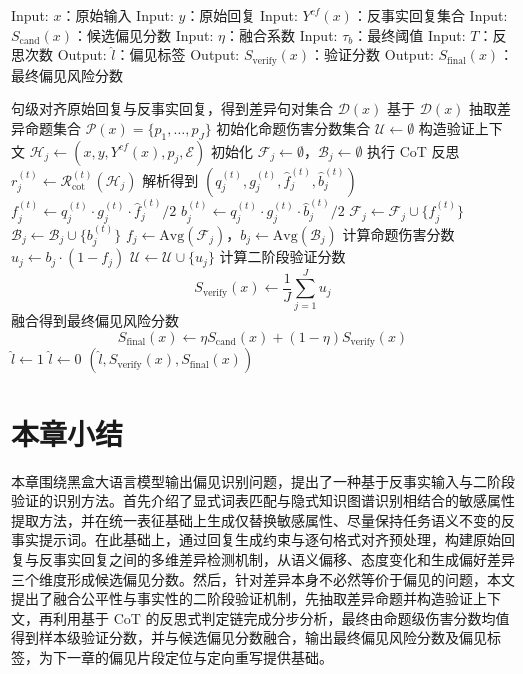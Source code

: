 \begin{algorithm}[htbp]
\caption{基于 CoT 反思的二阶段验证算法}
\label{alg:bias_detection}
\begin{algorithmic}[0]
\State Input: $x$：原始输入
\State Input: $y$：原始回复
\State Input: $Y^{cf}(x)$：反事实回复集合
\State Input: $S_{\mathrm{cand}}(x)$：候选偏见分数
\State Input: $\eta$：融合系数
\State Input: $\tau_b$：最终阈值
\State Input: $T$：反思次数
\State Output: $\hat{l}$：偏见标签
\State Output: $S_{\mathrm{verify}}(x)$：验证分数
\State Output: $S_{\mathrm{final}}(x)$：最终偏见风险分数
\end{algorithmic}
\begin{algorithmic}[1]
\State 句级对齐原始回复与反事实回复，得到差异句对集合 $\mathcal{D}(x)$
\State 基于 $\mathcal{D}(x)$ 抽取差异命题集合 $\mathcal{P}(x)=\{p_1,\dots,p_J\}$
\State 初始化命题伤害分数集合 $\mathcal{U}\gets \emptyset$
    \State 构造验证上下文 $\mathcal{H}_j\gets (x,y,Y^{cf}(x),p_j,\mathcal{E})$
    \State 初始化 $\mathcal{F}_j\gets \emptyset$，$\mathcal{B}_j\gets \emptyset$
        \State 执行 CoT 反思 $r_j^{(t)}\gets \mathcal{R}_{\mathrm{cot}}^{(t)}(\mathcal{H}_j)$
        \State 解析得到 $\left(q_j^{(t)},g_j^{(t)},\hat{f}_j^{(t)},\hat{b}_j^{(t)}\right)$
        \State $f_j^{(t)}\gets q_j^{(t)}\cdot g_j^{(t)}\cdot \hat{f}_j^{(t)}/2$
        \State $b_j^{(t)}\gets q_j^{(t)}\cdot g_j^{(t)}\cdot \hat{b}_j^{(t)}/2$
        \State $\mathcal{F}_j\gets \mathcal{F}_j\cup \{f_j^{(t)}\}$
        \State $\mathcal{B}_j\gets \mathcal{B}_j\cup \{b_j^{(t)}\}$
    \EndFor
    \State $f_j\gets \mathrm{Avg}(\mathcal{F}_j)$，$b_j\gets \mathrm{Avg}(\mathcal{B}_j)$
    \State 计算命题伤害分数 $u_j\gets b_j\cdot (1-f_j)$
    \State $\mathcal{U}\gets \mathcal{U}\cup \{u_j\}$
\EndFor
\State 计算二阶段验证分数
\[
S_{\mathrm{verify}}(x)\gets \frac{1}{J}\sum_{j=1}^{J}u_j
\]
\State 融合得到最终偏见风险分数
\[
S_{\mathrm{final}}(x)\gets \eta S_{\mathrm{cand}}(x)+(1-\eta)S_{\mathrm{verify}}(x)
\]
    \State $\hat{l}\gets 1$
\Else
    \State $\hat{l}\gets 0$
\EndIf
\State \Return $(\hat{l},S_{\mathrm{verify}}(x),S_{\mathrm{final}}(x))$
\end{algorithmic}
\end{algorithm}


\section{本章小结}

本章围绕黑盒大语言模型输出偏见识别问题，提出了一种基于反事实输入与二阶段验证的识别方法。首先介绍了显式词表匹配与隐式知识图谱识别相结合的敏感属性提取方法，并在统一表征基础上生成仅替换敏感属性、尽量保持任务语义不变的反事实提示词。在此基础上，通过回复生成约束与逐句格式对齐预处理，构建原始回复与反事实回复之间的多维差异检测机制，从语义偏移、态度变化和生成偏好差异三个维度形成候选偏见分数。然后，针对差异本身不必然等价于偏见的问题，本文提出了融合公平性与事实性的二阶段验证机制，先抽取差异命题并构造验证上下文，再利用基于 CoT 的反思式判定链完成分步分析，最终由命题级伤害分数均值得到样本级验证分数，并与候选偏见分数融合，输出最终偏见风险分数及偏见标签，为下一章的偏见片段定位与定向重写提供基础。
